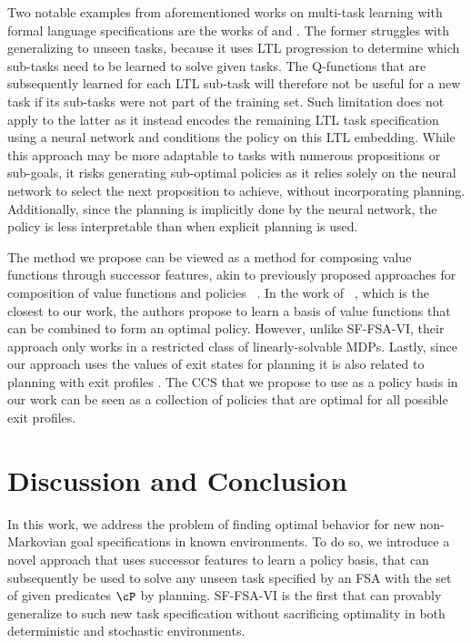 Two notable examples from aforementioned works on multi-task learning with formal language specifications are the works of \citet{Icarte2018b} and \citet{Vaezipoor2021}. The former struggles with generalizing to unseen tasks, because it uses LTL progression to determine which sub-tasks need to be learned to solve given tasks. The Q-functions that are subsequently learned for each LTL sub-task will therefore not be useful for a new task if its sub-tasks were not part of the training set. Such limitation does not apply to the latter as it instead encodes the remaining LTL task specification using a neural network and conditions the policy on this LTL embedding. While this approach may be more adaptable to tasks with numerous propositions or sub-goals, it risks generating sub-optimal policies as it relies solely on the neural network to select the next proposition to achieve, without incorporating planning. Additionally, since the planning is implicitly done by the neural network, the policy is less interpretable than when explicit planning is used.

The method we propose can be viewed as a method for composing value functions through successor features, akin to previously proposed approaches for composition of value functions and policies ~\citep{Niekerk2019, Barreto2019, NangueTasse2020, Infante2022}. In the work of ~\citet{Infante2022}, which is the closest to our work, the authors propose to learn a basis of value functions that can be combined to form an optimal policy. However, unlike SF-FSA-VI, their approach only works in a restricted class of linearly-solvable MDPs. Lastly, since our approach uses the values of exit states for planning it is also related to planning with exit profiles \citep{Wen2020}. The CCS that we propose to use as a policy basis in our work can be seen as a collection of policies that are optimal for all possible exit profiles.

\section{Discussion and Conclusion}

In this work, we address the problem of finding optimal behavior for new non-Markovian goal specifications in known environments. To do so, we introduce a novel approach that uses successor features to learn a policy basis, that can subsequently be used to solve any unseen task specified by an FSA with the set of given predicates $\cP$ by planning. SF-FSA-VI is the first that can provably generalize to such new task specification without sacrificing optimality in both deterministic and stochastic environments.

